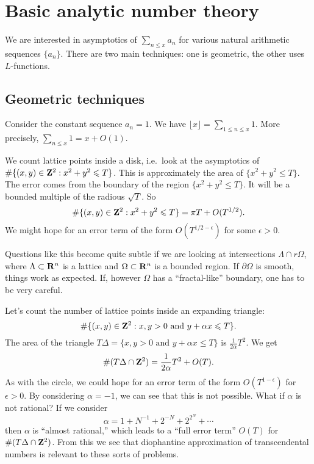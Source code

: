 
\section{Basic analytic number theory}\label{sec:granville-ii}





We are interested in asymptotics of $\sum_{n\leqslant x} a_n$ for various 
natural arithmetic sequences $\{a_n\}$. There are two main techniques: one is 
geometric, the other uses $L$-functions. 





\subsection{Geometric techniques}

\begin{example}
Consider the constant sequence $a_n=1$. We have 
$\lfloor x\rfloor = \sum_{1\leqslant n \leqslant x} 1$. More precisely, 
$\sum_{n\leqslant x} 1 = x+O(1)$. 
\end{example}

\begin{example}
We count lattice points inside a disk, i.e.~look at the asymptotics of 
$\#\{(x,y)\in \mathbf{Z}^2:x^2+y^2\leqslant T\}$. This is approximately the area of 
$\{x^2+y^2\leqslant T\}$. The error comes from the boundary of the region 
$\{x^2+y^2\leqslant T\}$. It will be a bounded multiple of the radious 
$\sqrt T$. So 
\[
  \#\{(x,y)\in \mathbf{Z}^2:x^2+y^2\leqslant T\} = \pi T + O(T^{1/2}) . 
\]
We might hope for an error term of the form $O(T^{1/2-\epsilon})$ for some 
$\epsilon>0$. 
\end{example}

Questions like this become quite subtle if we are looking at intersections 
$\Lambda\cap r\Omega$, where $\Lambda\subset \mathbf{R}^n$ is a lattice and 
$\Omega\subset \mathbf{R}^n$ is a bounded region. If $\partial\Omega$ is smooth, 
things work as expected. If, however $\Omega$ has a ``fractal-like'' boundary, 
one has to be very careful. 

\begin{example}
Let's count the number of lattice points inside an expanding triangle: 
\[
  \#\{(x,y)\in \mathbf{Z}^2:x,y>0\text{ and }y+\alpha x\leqslant T\} .
\]
The area of the triangle 
$T\Delta = \{x,y>0\text{ and }y+\alpha x\leqslant T\}$ is 
$\frac{1}{2\alpha}T^2$. We get 
\[
  \#(T\Delta\cap \mathbf{Z}^2) = \frac{1}{2\alpha} T^2 + O(T) .
\]
As with the circle, we could hope for an error term of the form 
$O(T^{1-\epsilon})$ for $\epsilon>0$. By considering $\alpha=-1$, we can see 
that this is not possible. What if $\alpha$ is not rational? If we 
consider 
\[
  \alpha = 1+N^{-1} + 2^{-N} + 2^{2^N} + \cdots
\]
then $\alpha$ is ``almost rational,'' which leads to a ``full error term'' 
$O(T)$ for $\# (T\Delta\cap \mathbf{Z}^2)$. From this we see that diophantine 
approximation of transcendental numbers is relevant to these sorts of 
problems. 
\end{example}

